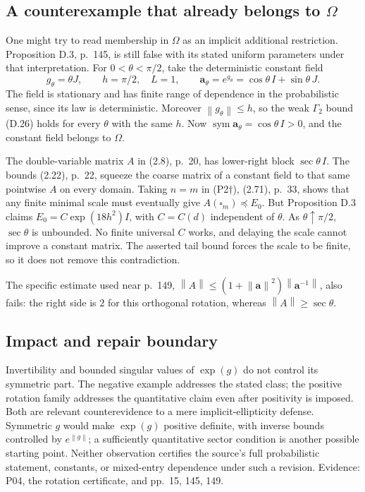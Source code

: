 \documentclass[10pt]{article}
\begin{document}
\subsection*{A counterexample that already belongs to \(\Omega\)}
One might try to read membership in \(\Omega\) as an implicit additional restriction. Proposition D.3, p. 145, is still false with its stated uniform parameters under that interpretation. For \(0<\theta<\pi/2\), take the deterministic constant field \[g_\theta=\theta J,\qquad h=\pi/2,\quad L=1,\qquad
 \mathbf a_\theta=e^{g_\theta}
 =\cos\theta\,I+\sin\theta\,J.\] The field is stationary and has finite range of dependence in the probabilistic sense, since its law is deterministic. Moreover \(\left\lVert g_\theta\right\rVert\le h\), so the weak \(\Gamma_2\) bound (D.26) holds for every \(\theta\) with the same \(h\). Now \(\operatorname{sym}\mathbf a_\theta=\cos\theta\,I>0\), and the constant field belongs to \(\Omega\).\par
The double-variable matrix \(A\) in (2.8), p. 20, has lower-right block \(\sec\theta\,I\). The bounds (2.22), p. 22, squeeze the coarse matrix of a constant field to that same pointwise \(A\) on every domain. Taking \(n=m\) in (P2\(\dagger\)), (2.71), p. 33, shows that any finite minimal scale must eventually give \(A(\square_m)\preceq E_0\). But Proposition D.3 claims \(E_0=C\exp(18h^2)I\), with \(C=C(d)\) independent of \(\theta\). As \(\theta\uparrow\pi/2\), \(\sec\theta\) is unbounded. No finite universal \(C\) works, and delaying the scale cannot improve a constant matrix. The asserted tail bound forces the scale to be finite, so it does not remove this contradiction.\par
The specific estimate used near p. 149, \(\left\lVert A\right\rVert\le(1+\left\lVert\mathbf a\right\rVert^2)\left\lVert\mathbf a^{-1}\right\rVert\), also fails: the right side is \(2\) for this orthogonal rotation, whereas \(\left\lVert A\right\rVert\ge\sec\theta\).\par
\subsection*{Impact and repair boundary}
Invertibility and bounded singular values of \(\exp(g)\) do not control its symmetric part. The negative example addresses the stated class; the positive rotation family addresses the quantitative claim even after positivity is imposed. Both are relevant counterevidence to a mere implicit-ellipticity defense. Symmetric \(g\) would make \(\exp(g)\) positive definite, with inverse bounds controlled by \(e^{\left\lVert g\right\rVert}\); a sufficiently quantitative sector condition is another possible starting point. Neither observation certifies the source’s full probabilistic statement, constants, or mixed-entry dependence under such a revision. Evidence: P04, the rotation certificate, and pp. 15, 145, 149.\par
\end{document}
